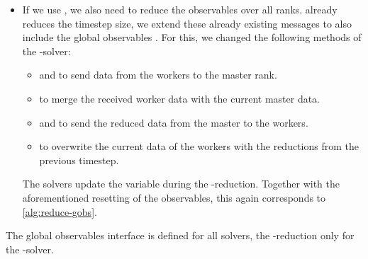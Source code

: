 \begin{itemize}
\begin{itemize}
  \end{itemize}
\item If we use \mpi{}, we also need to reduce the observables over all ranks.
  \exahype{} already reduces the timestep size, we extend these already existing \mpi{} messages to also include the global observables .
  For this, we changed the following methods of the \dg{}-solver:
  \begin{itemize}
  \item {} and  to send data from the workers to the master rank.
  \item {} to merge the received worker data with the current master data. 
  \item {} and  to send the reduced data from the master to the workers.
  \item {} to overwrite the current data of the workers with the reductions from the previous timestep.
  \end{itemize}
  The solvers update the variable  during the \mpi{}-reduction.
  Together with the aforementioned resetting of the observables, this again corresponds to \cref{alg:reduce-gobs}.
\end{itemize}
The global observables interface is defined for all solvers, the \mpi{}-reduction only for the \aderdg{}-solver.


